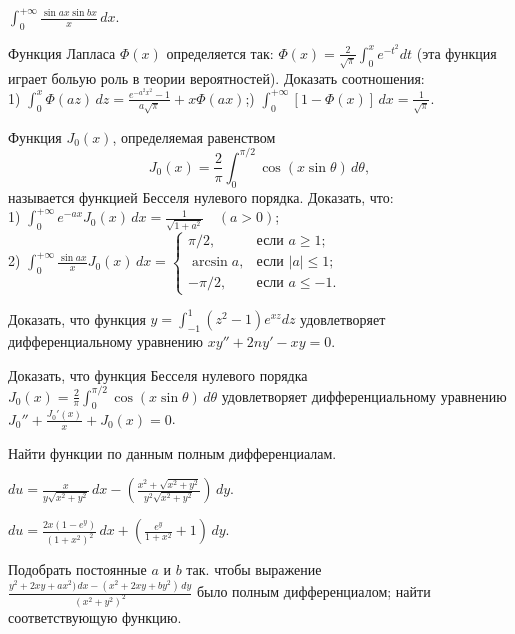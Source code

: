 \documentclass[a5paper,10pt]{article}
\begin{document}
\medskip
{} $\displaystyle \int_0^{+\infty}\frac{\sin ax\sin bx}{x}\,dx$.

\medskip
{} Функция Лапласа $\Phi(x)$ определяется так:
$\displaystyle\Phi(x)=\frac{2}{\sqrt{\pi}}\int_0^xe^{-t^2}dt$
(эта функция играет больую роль в теории вероятностей). Доказать соотношения:\\
1) $\displaystyle\int_0^x\Phi(az)\,dz=\frac{e^{-a^2x^2}-1}{a\sqrt{\pi}}+x\Phi(ax)$;) $\displaystyle\int_0^{+\infty}[1-\Phi(x)]\,dx=\frac{1}{\sqrt{\pi}}$.

\medskip
{} Функция $J_0(x)$, определяемая равенством
$$J_0(x)=\frac{2}{\pi}\int_0^{\pi/2}\cos(x\sin\theta)\,d\theta,$$
называется функцией Бесселя нулевого порядка. Доказать, что:\\
1) $\displaystyle\int_0^{+\infty}e^{-ax}J_0(x)\,dx=\frac{1}{\sqrt{1+a^2}}\quad (a>0)$;\\
2) $\displaystyle\int_0^{+\infty}\frac{\sin ax}{x}J_0(x)\,dx=
\begin{cases}\pi/2, & \mbox{если }a\ge1;\\
\arcsin a, &\mbox{если }|a|\le 1;\\
-\pi/2, & \mbox{если }a\le-1.
\end{cases}$

\medskip
{} Доказать, что функция $\displaystyle y=\int_{-1}^1(z^2-1)e^{xz}dz$
удовлетворяет дифференциальному уравнению $xy''+2ny'-xy=0$.

\medskip
{} Доказать, что функция Бесселя нулевого порядка\\
$\displaystyle J_0(x)=\frac{2}{\pi}\int_0^{\pi/2}\cos(x\sin\theta)\,d\theta$
удовлетворяет дифференциальному уравнению $J_0''+\frac{J_0'(x)}{x}+J_0(x)=0$.

\medskip
\noindent Найти функции по данным полным дифференциалам.

\medskip
{} $\displaystyle du=\frac{x}{y\sqrt{x^2+y^2}}\,dx-
\left(\frac{x^2+\sqrt{x^2+y^2}}{y^2\sqrt{x^2+y^2}}\right)\,dy$.

\medskip
{} $\displaystyle du=\frac{2x(1-e^y)}{(1+x^2)^2}\,dx+
\left(\frac{e^y}{1+x^2}+1\right)\,dy$.

\medskip
{} Подобрать постоянные $a$ и $b$ так. чтобы выражение\\
$\displaystyle \frac{y^2+2xy+ax^2)\,dx-(x^2+2xy+by^2)\,dy}{(x^2+y^2)^2}$ было полным
дифференциалом; найти соответствующую функцию.
\end{document}
